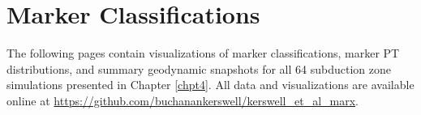\cleardoublepage

\hypertarget{vis}{%
\section{Marker Classifications}\label{vis}}

The following pages contain visualizations of marker classifications, marker PT distributions, and summary geodynamic snapshots for all 64 subduction zone simulations presented in Chapter \ref{chpt4}. All data and visualizations are available online at \url{https://github.com/buchanankerswell/kerswell_et_al_marx}.


